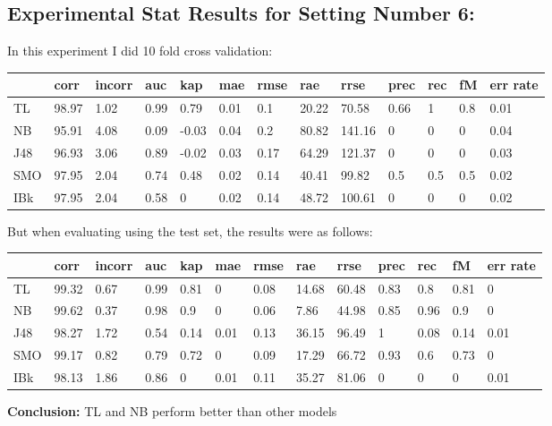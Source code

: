 \documentclass[a4paper,12pt, english]{article}
\begin{document}
\subsection{Experimental Stat Results for Setting Number 6:}
In this experiment I did 10 fold cross validation:
\begin{small}
\begin{center}
    \begin{tabular}{ | l | l | l | l | l | l | l | l | l | l | l | l | l |}
    \hline
      	& corr & incorr  & auc & kap & mae & rmse & rae & rrse & prec & rec & fM & err rate\\ \hline
      	TL & 98.97 & 1.02 & 0.99 & 0.79 & 0.01 & 0.1 & 20.22 & 70.58 & 0.66 & 1 & 0.8 & 0.01\\ \hline
	NB & 95.91 & 4.08 & 0.09 & -0.03 & 0.04 & 0.2 & 80.82 & 141.16 & 0 & 0 & 0 & 0.04\\ \hline
	J48 & 96.93 & 3.06 & 0.89 & -0.02 & 0.03 & 0.17 & 64.29 & 121.37 & 0 & 0 & 0 & 0.03\\ \hline
	SMO & 97.95 & 2.04 & 0.74 & 0.48 & 0.02 & 0.14 & 40.41 & 99.82 & 0.5 & 0.5 & 0.5 & 0.02\\ \hline
	IBk & 97.95 & 2.04 & 0.58 & 0 & 0.02 & 0.14 & 48.72 & 100.61 & 0 & 0 & 0 & 0.02\\ \hline  
    \end{tabular}       
\end{center}
\end{small}

But when evaluating using the test set, the results were as follows:
\begin{small}
\begin{center}
    \begin{tabular}{ | l | l | l | l | l | l | l | l | l | l | l | l | l |}
    \hline
      	& corr & incorr  & auc & kap & mae & rmse & rae & rrse & prec & rec & fM & err rate\\ \hline
      	TL & 99.32 & 0.67 & 0.99 & 0.81 & 0 & 0.08 & 14.68 & 60.48 & 0.83 & 0.8 & 0.81 & 0\\ \hline
	NB & 99.62 & 0.37 & 0.98 & 0.9 & 0 & 0.06 & 7.86 & 44.98 & 0.85 & 0.96 & 0.9 & 0\\ \hline
	J48 & 98.27 & 1.72 & 0.54 & 0.14 & 0.01 & 0.13 & 36.15 & 96.49 & 1 & 0.08 & 0.14 & 0.01\\ \hline
	SMO & 99.17 & 0.82 & 0.79 & 0.72 & 0 & 0.09 & 17.29 & 66.72 & 0.93 & 0.6 & 0.73 & 0\\ \hline
	IBk & 98.13 & 1.86 & 0.86 & 0 & 0.01 & 0.11 & 35.27 & 81.06 & 0 & 0 & 0 & 0.01\\ \hline  
    \end{tabular}       
\end{center}
\end{small}
\textbf{Conclusion:} TL and NB perform better than other models
\end{document}
